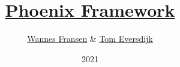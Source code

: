 \documentclass{beamer}
\title{\href{https://hexdocs.pm/phoenix/Phoenix.html}{Phoenix Framework}}
\author{\href{https://github.com/WannesFransen1994}{Wannes Fransen} \& \href{https://github.com/TomEversdijk}{Tom Eversdijk}}
\institute{\href{https://www.ucll.be}{UC Leuven}}
\date{2021}
\begin{document}
\frame{\titlepage}










\end{document}

